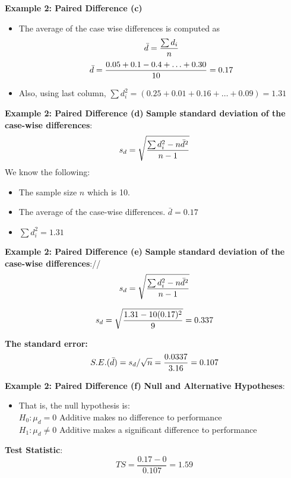 \documentclass[a4]{beamer}
\begin{document}

\noindent \textbf{Example 2: Paired Difference (c)}
\begin{itemize}
\item The average of the case wise differences is computed as \[\bar{d} = {\sum d_i \over n}\]
\[ \bar{d} = { 0.05 + 0.1  - 0.4 + \ldots + 0.30 \over 10 }= 0.17 \]
\item Also, using last column, $\sum d^2_i = (0.25 + 0.01 + 0.16 + \ldots + 0.09) = 1.31$
\end{itemize}





\noindent \textbf{Example 2: Paired Difference (d)}
\textbf{Sample standard deviation of the case-wise differences}:
\large
\[s_d = \sqrt{ {\sum d_i^2 - n\bar{d}^2 \over n-1}}\]
We know the following:
\begin{itemize}
\item The sample size $n$ which is 10.
\item The average of the case-wise differences. $\bar{d} = 0.17$
\item  $\sum d^2_i = 1.31$
\end{itemize}





\noindent \textbf{Example 2: Paired Difference (e)}
\textbf{Sample standard deviation  of the case-wise differences}://
\[s_d = \sqrt{ {\sum d_i^2 - n\bar{d}^2 \over n-1}}\]

\[s_d = \sqrt{ { 1.31 - 10(0.17)^2 \over 9}} = 0.337\]

\textbf{The standard error:} \[ S.E.(\bar{d}) = s_d / \sqrt{n} = {0.0337 \over 3.16} = 0.107\]



\noindent \textbf{Example 2: Paired Difference (f)}
\textbf{Null and Alternative Hypotheses}:
\begin{itemize}
\item That is, the null hypothesis is:\\
$H_0: \mu_d = 0$ Additive makes no difference to performance\\
$H_1: \mu_d \neq 0$ Additive makes a significant difference to performance \\
\end{itemize}
\textbf{Test Statistic}:
\[ TS = \frac{0.17 - 0}{0.107} = 1.59\]
\end{document}
